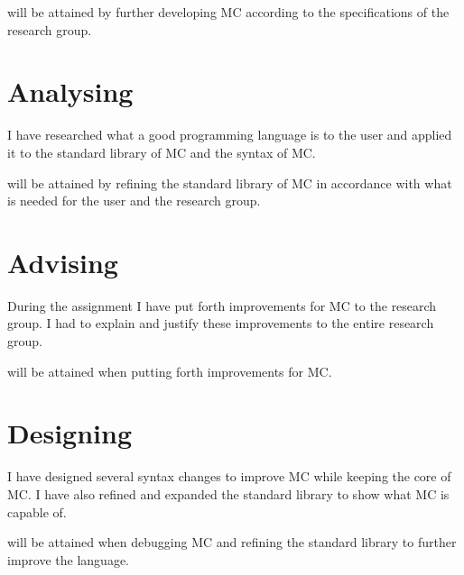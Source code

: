 will be attained by further developing MC according to the specifications of the research group.

\section{Analysing}
I have researched what a good programming language is to the user and applied it to the standard library of MC and the syntax of MC.

will be attained by refining the standard library of MC in accordance with what is needed for the user and the research group.

\section{Advising}
During the assignment I have put forth improvements for MC to the research group.
I had to explain and justify these improvements to the entire research group.

will be attained when putting forth improvements for MC.

\section{Designing}
I have designed several syntax changes to improve MC while keeping the core of MC.
I have also refined and expanded the standard library to show what MC is capable of.

will be attained when debugging MC and refining the standard library to further improve the language.





